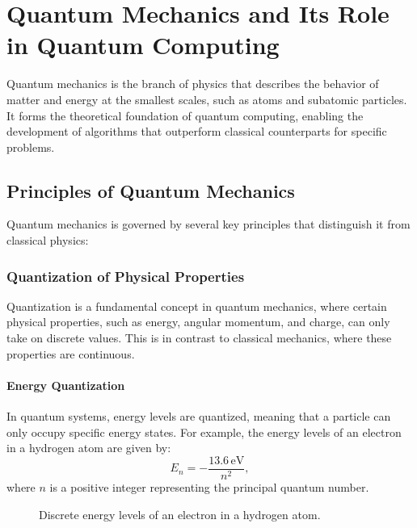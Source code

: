 \documentclass[12pt,a4paper]{report}
\begin{document}
\chapter{Quantum Mechanics and Its Role in Quantum Computing}
\label{chap:quantum_mechanics}
Quantum mechanics is the branch of physics that describes the behavior of matter and energy at the smallest scales, such as atoms and subatomic particles. It forms the theoretical foundation of quantum computing, enabling the development of algorithms that outperform classical counterparts for specific problems.

\section{Principles of Quantum Mechanics}
Quantum mechanics is governed by several key principles that distinguish it from classical physics:

\subsection{Quantization of Physical Properties}
Quantization is a fundamental concept in quantum mechanics, where certain physical properties, such as energy, angular momentum, and charge, can only take on discrete values. This is in contrast to classical mechanics, where these properties are continuous.

\subsubsection{Energy Quantization}
In quantum systems, energy levels are quantized, meaning that a particle can only occupy specific energy states. For example, the energy levels of an electron in a hydrogen atom are given by:
\[
E_n = -\frac{13.6 \, \text{eV}}{n^2},
\]
where \( n \) is a positive integer representing the principal quantum number.

\begin{figure}[H]
    \centering
    \caption{Discrete energy levels of an electron in a hydrogen atom.}
\end{figure}
\end{document}
